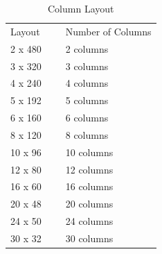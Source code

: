 \begin{table}
\centering
\caption{Column Layout}
\label{column}
    \begin{tabular}{lll}
    Layout  & ~ & Number of Columns \\
    2 x 480 & ~ & 2 columns         \\
    3 x 320 & ~ & 3 columns         \\
    4 x 240 & ~ & 4 columns         \\
    5 x 192 & ~ & 5 columns         \\
    6 x 160 & ~ & 6 columns         \\
    8 x 120 & ~ & 8 columns         \\
    10 x 96 & ~ & 10 columns        \\
    12 x 80 & ~ & 12 columns        \\
    16 x 60 & ~ & 16 columns        \\
    20 x 48 & ~ & 20 columns        \\
    24 x 50 & ~ & 24 columns        \\
    30 x 32 & ~ & 30 columns        \\
    \end{tabular}
\end{table}